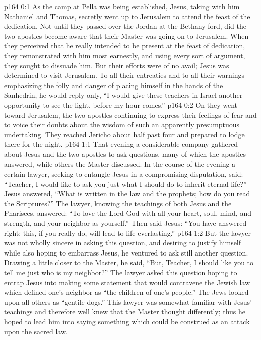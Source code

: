 \author{Midwayer Commission}
\vs p164 0:1 As the camp at Pella was being established, Jesus, taking with him Nathaniel and Thomas, secretly went up to Jerusalem to attend the feast of the dedication. Not until they passed over the Jordan at the Bethany ford, did the two apostles become aware that their Master was going on to Jerusalem. When they perceived that he really intended to be present at the feast of dedication, they remonstrated with him most earnestly, and using every sort of argument, they sought to dissuade him. But their efforts were of no avail; Jesus was determined to visit Jerusalem. To all their entreaties and to all their warnings emphasizing the folly and danger of placing himself in the hands of the Sanhedrin, he would reply only, \textcolor{ubdarkred}{“I would give these teachers in Israel another opportunity to see the light, before my hour comes.”}
\vs p164 0:2 On they went toward Jerusalem, the two apostles continuing to express their feelings of fear and to voice their doubts about the wisdom of such an apparently presumptuous undertaking. They reached Jericho about half past four and prepared to lodge there for the night.
\vs p164 1:1 That evening a considerable company gathered about Jesus and the two apostles to ask questions, many of which the apostles answered, while others the Master discussed. In the course of the evening a certain lawyer, seeking to entangle Jesus in a compromising disputation, said: “Teacher, I would like to ask you just what I should do to inherit eternal life?” Jesus answered, \textcolor{ubdarkred}{“What is written in the law and the prophets; how do you read the Scriptures?”} The lawyer, knowing the teachings of both Jesus and the Pharisees, answered: “To love the Lord God with all your heart, soul, mind, and strength, and your neighbor as yourself.” Then said Jesus: \textcolor{ubdarkred}{“You have answered right; this, if you really do, will lead to life everlasting.”}
\vs p164 1:2 But the lawyer was not wholly sincere in asking this question, and desiring to justify himself while also hoping to embarrass Jesus, he ventured to ask still another question. Drawing a little closer to the Master, he said, “But, Teacher, I should like you to tell me just who is my neighbor?” The lawyer asked this question hoping to entrap Jesus into making some statement that would contravene the Jewish law which defined one’s neighbor as “the children of one’s people.” The Jews looked upon all others as “gentile dogs.” This lawyer was somewhat familiar with Jesus’ teachings and therefore well knew that the Master thought differently; thus he hoped to lead him into saying something which could be construed as an attack upon the sacred law.\plusone
